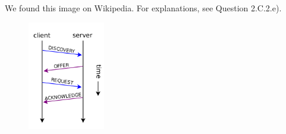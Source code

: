 We found this image on Wikipedia. For explanations, see Question 2.C.2.e).


\begin{figure}[!ht]
  \centering
    \includegraphics[width=0.3\textwidth]{images/DHCP_session.png}
\end{figure}
